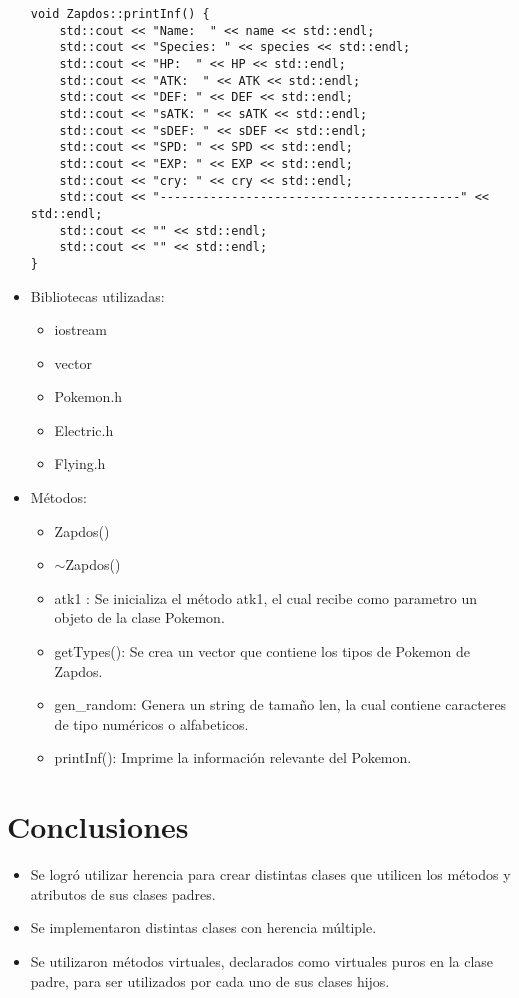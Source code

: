 \documentclass[11pt]{article}
\begin{document}
\begin{itemize}
\begin{lstlisting}
void Zapdos::printInf() {
    std::cout << "Name:  " << name << std::endl;
    std::cout << "Species: " << species << std::endl;
    std::cout << "HP:  " << HP << std::endl;
    std::cout << "ATK:  " << ATK << std::endl;
    std::cout << "DEF: " << DEF << std::endl;
    std::cout << "sATK: " << sATK << std::endl;
    std::cout << "sDEF: " << sDEF << std::endl;
    std::cout << "SPD: " << SPD << std::endl;
    std::cout << "EXP: " << EXP << std::endl;
    std::cout << "cry: " << cry << std::endl;
    std::cout << "------------------------------------------" << std::endl;
    std::cout << "" << std::endl;
    std::cout << "" << std::endl;
}
\end{lstlisting}
\item Bibliotecas utilizadas:
\begin{itemize}
\item iostream
\item vector
\item Pokemon.h
\item Electric.h
\item Flying.h

\end{itemize}
\item M\'etodos:
\begin{itemize}
\item Zapdos()
\item $\sim$Zapdos()
\item atk1 : 
Se inicializa el m\'etodo atk1, el cual recibe como parametro un objeto de la clase Pokemon.
\item getTypes(): Se crea un vector que contiene los tipos de Pokemon de Zapdos.
\item gen\_random: Genera un string de tama\~no len, la cual contiene caracteres de tipo num\'ericos o alfabeticos.
\item printInf(): Imprime la informaci\'on relevante del Pokemon.
\end{itemize}
\end{itemize}

\section{Conclusiones}
\begin{itemize}
\item Se logr\'o utilizar herencia para crear distintas clases que utilicen los m\'etodos y atributos de sus clases padres.
\item Se implementaron distintas clases con herencia m\'ultiple.
\item Se utilizaron m\'etodos virtuales, declarados como virtuales puros en la clase padre, para ser utilizados por cada uno de sus clases hijos.
\end{itemize}






\newpage


\end{document}
